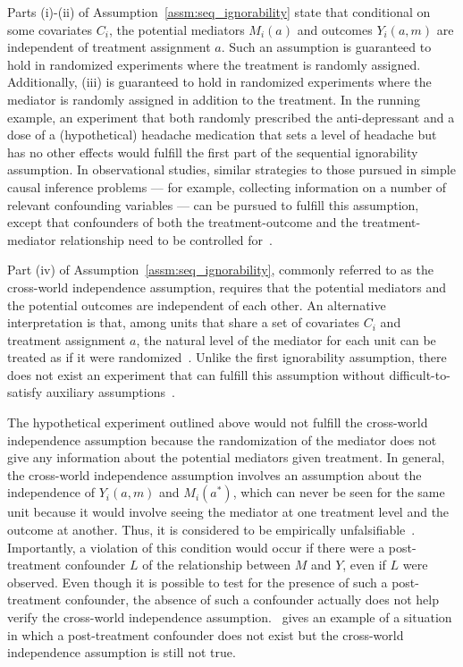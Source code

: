 Parts (i)-(ii) of Assumption~\ref{assm:seq_ignorability} state that conditional on some covariates $C_{i}$, the 
potential mediators $M_{i}(a)$ and outcomes $Y_{i}(a,m)$ are independent of treatment assignment $a$. Such an 
assumption is guaranteed to hold in randomized experiments where the treatment is randomly assigned. Additionally, 
(iii) is guaranteed to hold in randomized experiments where the mediator is randomly assigned in addition to the 
treatment. In the running example, an experiment that both randomly prescribed the anti-depressant and a dose of a 
(hypothetical) headache medication that sets a level of headache but has no other effects would fulfill the 
first part of the sequential ignorability assumption. In observational studies, similar strategies to those pursued
in simple causal inference problems --- for example, collecting information on a number
of relevant confounding variables --- can be pursued to fulfill this assumption, except that confounders of both 
the treatment-outcome and the treatment-mediator relationship need to be controlled for~\citep{imaietal2010b}.  

Part (iv) of Assumption~\ref{assm:seq_ignorability}, commonly referred to as the cross-world independence assumption,
requires that the potential mediators and the potential outcomes are independent of each other. 
An alternative interpretation is that, among units that 
share a set of covariates $C_{i}$ and treatment assignment $a$, the natural level of the mediator for each unit 
can be treated as if it were randomized~\citep{imaietal2010a}. Unlike the first ignorability assumption, there does not 
exist an experiment that can fulfill this assumption without difficult-to-satisfy 
auxiliary assumptions~\citep{imaietal2013}.

The hypothetical experiment outlined above would not fulfill the cross-world independence assumption 
because the randomization of the mediator does not give any information about the potential mediators
given treatment. In general, the cross-world independence assumption involves an assumption about the 
independence of $Y_{i}(a,m)$ and $M_{i}(a^{*})$, which can never be seen for the same unit because it would involve
seeing the mediator at one treatment level and the outcome at another. Thus, it is considered to be empirically 
unfalsifiable~\citep{vanderweelevansteelandt2009, vanderweeleetal2014}. Importantly, a violation of this 
condition would occur if there were a 
post-treatment confounder $L$ of the relationship between $M$ and $Y$, even if $L$ were observed. Even though it is 
possible to test for the presence of such a post-treatment confounder, the absence of such a confounder actually
does not help verify the cross-world independence assumption.~\cite{andrewsdidelez2021} gives an example of a
situation in which a post-treatment confounder does not exist but the cross-world independence assumption is still not
true. 

